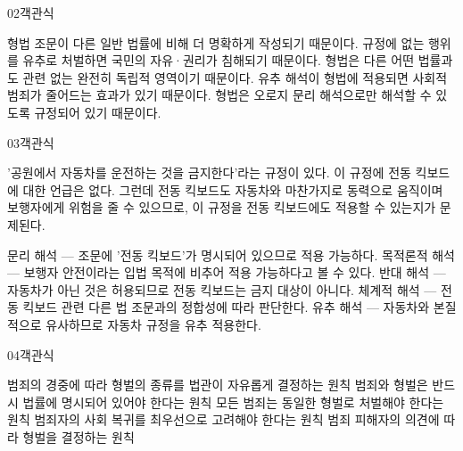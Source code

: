 \documentclass[fs85,seriesWit]{korfarm-base}
\begin{document}
\begin{kfQBlock}{02}{객관식}
\begin{kfChoices}
\kfChoice 형법 조문이 다른 일반 법률에 비해 더 명확하게 작성되기 때문이다.
\kfChoice 규정에 없는 행위를 유추로 처벌하면 국민의 자유·권리가 침해되기 때문이다.
\kfChoice 형법은 다른 어떤 법률과도 관련 없는 완전히 독립적 영역이기 때문이다.
\kfChoice 유추 해석이 형법에 적용되면 사회적 범죄가 줄어드는 효과가 있기 때문이다.
\kfChoice 형법은 오로지 문리 해석으로만 해석할 수 있도록 규정되어 있기 때문이다.
\end{kfChoices}
\end{kfQBlock}

\begin{kfQBlock}{03}{객관식}
\begin{kfEvidence}'공원에서 자동차를 운전하는 것을 금지한다'라는 규정이 있다. 이 규정에 전동 킥보드에 대한 언급은 없다. 그런데 전동 킥보드도 자동차와 마찬가지로 동력으로 움직이며 보행자에게 위험을 줄 수 있으므로, 이 규정을 전동 킥보드에도 적용할 수 있는지가 문제된다.\end{kfEvidence}
\begin{kfChoices}
\kfChoice 문리 해석 — 조문에 '전동 킥보드'가 명시되어 있으므로 적용 가능하다.
\kfChoice 목적론적 해석 — 보행자 안전이라는 입법 목적에 비추어 적용 가능하다고 볼 수 있다.
\kfChoice 반대 해석 — 자동차가 아닌 것은 허용되므로 전동 킥보드는 금지 대상이 아니다.
\kfChoice 체계적 해석 — 전동 킥보드 관련 다른 법 조문과의 정합성에 따라 판단한다.
\kfChoice 유추 해석 — 자동차와 본질적으로 유사하므로 자동차 규정을 유추 적용한다.
\end{kfChoices}
\end{kfQBlock}

\begin{kfQBlock}{04}{객관식}
\begin{kfChoices}
\kfChoice 범죄의 경중에 따라 형벌의 종류를 법관이 자유롭게 결정하는 원칙
\kfChoice 범죄와 형벌은 반드시 법률에 명시되어 있어야 한다는 원칙
\kfChoice 모든 범죄는 동일한 형벌로 처벌해야 한다는 원칙
\kfChoice 범죄자의 사회 복귀를 최우선으로 고려해야 한다는 원칙
\kfChoice 범죄 피해자의 의견에 따라 형벌을 결정하는 원칙
\end{kfChoices}
\end{kfQBlock}

\kfEndMC
\end{document}
